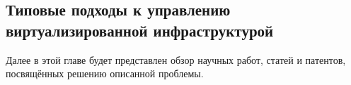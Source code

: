 \subsection[Типовые подходы к управлению виртуализированной \\ инфраструктурой]{Типовые подходы к управлению виртуализированной инфраструктурой}
Далее в этой главе будет представлен обзор научных работ, статей и патентов, посвящённых решению описанной проблемы.








